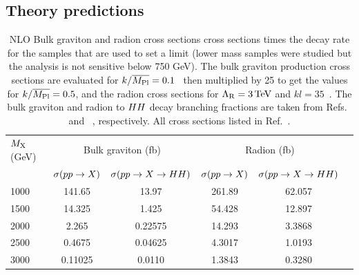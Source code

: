 \subsection{Theory predictions\label{ss:SignalXsec}}

\begin{table}[h]
  \begin{center}
    \caption{\small NLO Bulk graviton and radion cross sections cross sections times the decay rate for the samples that are used to set a limit (lower mass samples were studied but the analysis is not sensitive below 750 GeV). 
    The bulk graviton production cross sections are evaluated for $k/\overline{{M_\mathrm{Pl}}} = 0.1$~\cite{WED_BG_13TeV} then multiplied by 25 to get the values for $k/\overline{{M_\mathrm{Pl}}} = 0.5$, and the radion cross sections for $\Lambda_{\rm R} = 3\,\text{Te\hspace{-.08em}V}$ and $kl = 35$~\cite{WED_radion_13TeV}. 
    The bulk graviton and radion to $HH$ decay branching fractions are taken from Refs.~\cite{WED_BGHHDecay_13TeV} and ~\cite{WED_radionHHDecay_13TeV}, respectively. All cross sections listed in Ref.~\cite{KKGraviton_Bulk_github}.}
    \begin{tabular}{l|ccccc} 
      \hline
      \hline
      $M_{\textrm X}$ (GeV) & \multicolumn{2}{c}{Bulk graviton (fb)} & \multicolumn{2}{c}{Radion (fb)} \\ \cline{2-5}
      & $\sigma(pp \to X)$ & $\sigma(pp \to X \to HH )$ & $\sigma(pp \to X)$ & $\sigma(pp \to X \to HH )$ \\
      \hline
      1000  & 141.65     & 13.97   & 261.89 & 62.057 \\
      1500  & 14.325     & 1.425    & 54.428 & 12.897 \\
      2000  & 2.265  & 0.22575  & 14.293 & 3.3868 \\
      2500  & 0.4675  & 0.04625  & 4.3017 & 1.0193 \\
      3000  & 0.11025  & 0.0110  & 1.3843 & 0.3280 \\
      \hline
      \hline
    \end{tabular}
    \label{tab:signal_MC}
  \end{center}
\end{table}


